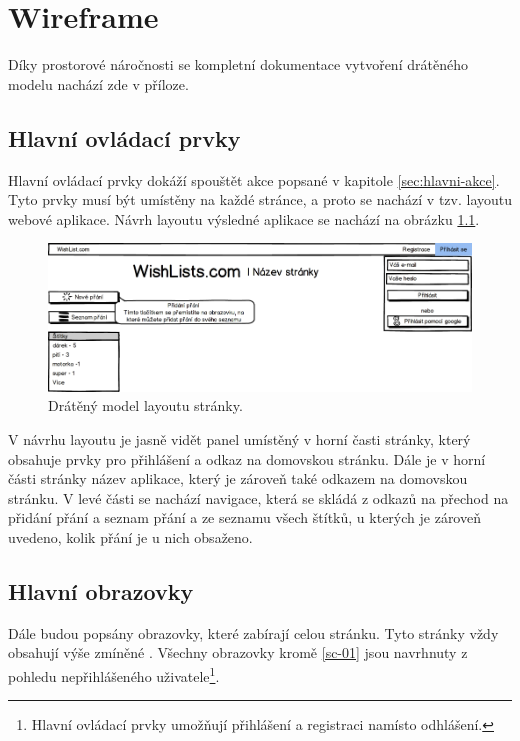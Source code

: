 \chapter{Wireframe}
\label{chp:wireframe}
Díky prostorové náročnosti se kompletní dokumentace vytvoření drátěného modelu nachází zde v příloze.

\section{Hlavní ovládací prvky}
\label{sec:hlavni-ovladaci-prvky}
Hlavní ovládací prvky dokáží spouštět akce popsané v kapitole \ref{sec:hlavni-akce}. Tyto prvky musí být umístěny na každé stránce, a proto se nachází v tzv. layoutu webové aplikace. Návrh layoutu výsledné aplikace se nachází na obrázku \ref{fig:mock-layout}.

\begin{figure}[htb]
\begin{center}
\includegraphics[width=130mm]{./pictures/mock/layout.png}
\caption{Drátěný model layoutu stránky.}
\label{fig:mock-layout}
\end{center}
\end{figure}

V návrhu layoutu je jasně vidět panel umístěný v horní časti stránky, který obsahuje prvky pro přihlášení a odkaz na domovskou stránku. Dále je v horní části stránky název aplikace, který je zároveň také odkazem na domovskou stránku. V levé části se nachází navigace, která se skládá z odkazů na přechod na přidání přání a seznam přání a ze seznamu všech štítků, u kterých je zároveň uvedeno, kolik přání je u nich obsaženo.

\section{Hlavní obrazovky}
Dále budou popsány obrazovky, které zabírají celou stránku. Tyto stránky vždy obsahují výše zmíněné . Všechny obrazovky kromě \ref{sc-01} jsou navrhnuty z pohledu nepřihlášeného uživatele\footnote{Hlavní ovládací prvky umožňují přihlášení a registraci namísto odhlášení.}.

